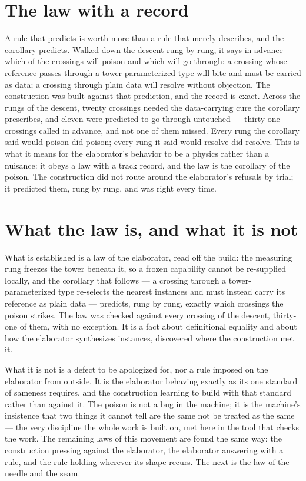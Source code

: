 \section{The law with a record}
\label{se:law-with-a-record}

A rule that predicts is worth more than a rule that merely describes, and the corollary predicts. Walked
down the descent rung by rung, it says in advance which of the crossings will poison and which will go
through: a crossing whose reference passes through a tower-parameterized type will bite and must be carried
as data; a crossing through plain data will resolve without objection. The construction was built against
that prediction, and the record is exact. Across the rungs of the descent, twenty crossings needed the
data-carrying cure the corollary prescribes, and eleven were predicted to go through untouched --- thirty-one
crossings called in advance, and not one of them missed. Every rung the corollary said would poison did
poison; every rung it said would resolve did resolve. This is what it means for the elaborator's behavior to
be a physics rather than a nuisance: it obeys a law with a track record, and the law is the corollary of the
poison. The construction did not route around the elaborator's refusals by trial; it predicted them, rung by
rung, and was right every time.

\section{What the law is, and what it is not}
\label{se:what-the-law-is}

What is established is a law of the elaborator, read off the build: the measuring rung freezes the tower
beneath it, so a frozen capability cannot be re-supplied locally, and the corollary that follows --- a
crossing through a tower-parameterized type re-selects the nearest instances and must instead carry its
reference as plain data --- predicts, rung by rung, exactly which crossings the poison strikes. The law was
checked against every crossing of the descent, thirty-one of them, with no exception. It is a fact about
definitional equality and about how the elaborator synthesizes instances, discovered where the construction
met it.

What it is not is a defect to be apologized for, nor a rule imposed on the elaborator from outside. It is
the elaborator behaving exactly as its one standard of sameness requires, and the construction learning to
build with that standard rather than against it. The poison is not a bug in the machine; it is the machine's
insistence that two things it cannot tell are the same not be treated as the same --- the very discipline
the whole work is built on, met here in the tool that checks the work. The remaining laws of this movement
are found the same way: the construction pressing against the elaborator, the elaborator answering with a
rule, and the rule holding wherever its shape recurs. The next is the law of the needle and the seam.
